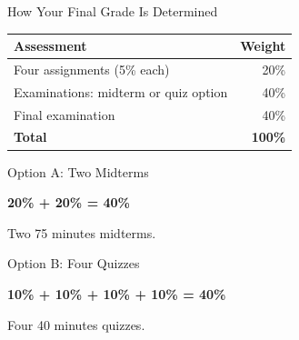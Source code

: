 \documentclass[aspectratio=169,10pt]{beamer}
\begin{document}

\begin{frame}{How Your Final Grade Is Determined}

\begin{center}
\begin{tabular}{@{}lr@{}}
\toprule
\textbf{Assessment} & \textbf{Weight} \\
\midrule
Four assignments (5\% each) & 20\% \\
Examinations: midterm or quiz option & 40\% \\
Final examination & 40\% \\
\midrule
\textbf{Total} & \textbf{100\%} \\
\bottomrule
\end{tabular}
\end{center}

  \begin{block}{Option A: Two Midterms}
    \begin{center}
       \textbf{20\% + 20\% = 40\%}
    \end{center}
    Two 75 minutes midterms.
  \end{block}

  \begin{block}{Option B: Four Quizzes}
    \begin{center}
      \textbf{10\% + 10\% + 10\% + 10\% = 40\%}
    \end{center}
    Four 40 minutes quizzes.
  \end{block}

\end{frame}

\end{document}
